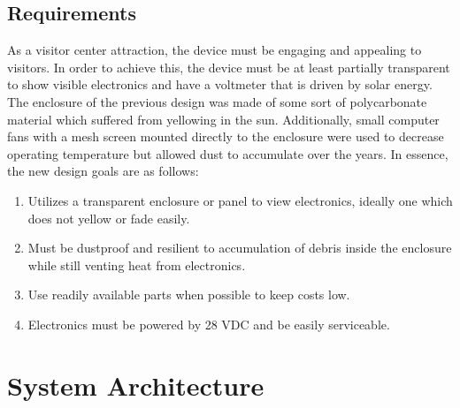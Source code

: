 \documentclass[titlepage]{article}
\begin{document}
\subsection{Requirements}
As a visitor center attraction, the device must be engaging and appealing to visitors. In order to achieve this, the device must be at least partially transparent to show visible electronics and have a voltmeter that is driven by solar energy. The enclosure of the previous design was made of some sort of polycarbonate material which suffered from yellowing in the sun. Additionally, small computer fans with a mesh screen mounted directly to the enclosure were used to decrease operating temperature but allowed dust to accumulate over the years. In essence, the new design goals are as follows:
\begin{enumerate}
    \item Utilizes a transparent enclosure or panel to view electronics, ideally one which does not yellow or fade easily.
    \item Must be dustproof and resilient to accumulation of debris inside the enclosure while still venting heat from electronics.
    \item Use readily available parts when possible to keep costs low.
    \item Electronics must be powered by 28 VDC and be easily serviceable.
\end{enumerate}


\section{System Architecture}
\end{document}
